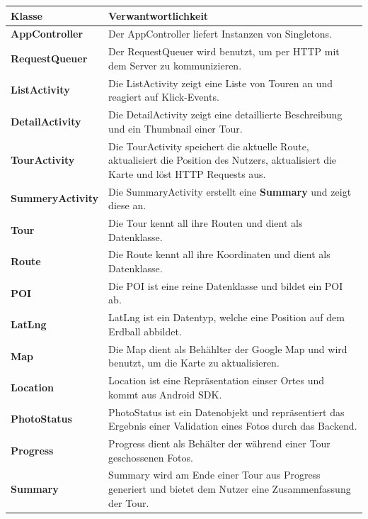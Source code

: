 \documentclass[a4paper,10pt,xetex]{article}
\begin{document}
\begin{longtabu} to \textwidth { | l | X[l] |  }
\hline
\textbf{Klasse} & \textbf{Verwantwortlichkeit}\\\hline
\endhead
\textbf{AppController} & Der AppController liefert Instanzen von Singletons.\\\hline
\textbf{RequestQueuer} & Der RequestQueuer wird benutzt, um per HTTP mit dem
Server zu kommunizieren.\\\hline
\textbf{ListActivity} & Die ListActivity zeigt eine Liste von Touren an und
reagiert auf Klick-Events.\\\hline
\textbf{DetailActivity} & Die DetailActivity zeigt eine detaillierte Beschreibung
und ein Thumbnail einer Tour.\\\hline
\textbf{TourActivity} & Die TourActivity speichert die aktuelle Route, aktualisiert
die Position des Nutzers, aktualisiert die Karte und löst HTTP Requests aus.\\\hline
\textbf{SummeryActivity} & Die SummaryActivity erstellt eine \textbf{Summary}
und zeigt diese an.\\\hline
\textbf{Tour} & Die Tour kennt all ihre Routen und dient als Datenklasse. \\\hline
\textbf{Route} & Die Route kennt all ihre Koordinaten und dient als
Datenklasse. \\\hline
\textbf{POI} & Die POI ist eine reine Datenklasse und bildet ein POI ab.\\\hline
\textbf{LatLng} & LatLng ist ein Datentyp, welche eine Position auf dem
Erdball abbildet.\\\hline
\textbf{Map} & Die Map dient als Behählter der Google Map und wird benutzt, um
die Karte zu aktualisieren.\\\hline
\textbf{Location} & Location ist eine Repräsentation einser Ortes und kommt aus
Android SDK.\\\hline
\textbf{PhotoStatus} & PhotoStatus ist ein Datenobjekt und repräsentiert das
Ergebnis einer Validation eines Fotos durch das Backend.\\\hline
\textbf{Progress} & Progress dient als Behälter der während einer Tour geschossenen
Fotos.\\\hline
\textbf{Summary} & Summary wird am Ende einer Tour aus Progress generiert und
bietet dem Nutzer eine Zusammenfassung der Tour.\\\hline
\end{longtabu}
\end{document}
